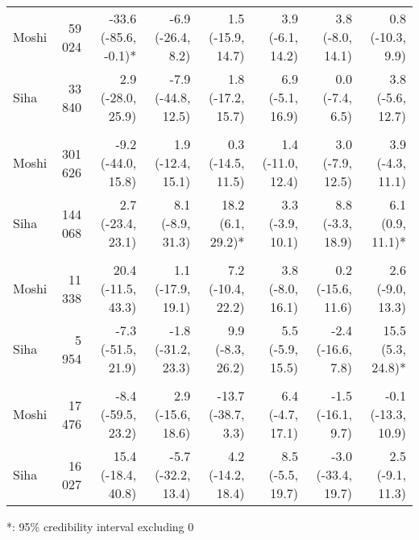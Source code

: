 \begin{table}[t]
\begin{tabular*}{\linewidth}{@{\extracolsep{\fill}}l|rrrrrrr}
\midrule\addlinespace[2.5pt]
Moshi & 59 024 & -33.6 (-85.6, -0.1)* & -6.9 (-26.4, 8.2)  & 1.5 (-15.9, 14.7)  & 3.9 (-6.1, 14.2)  & 3.8 (-8.0, 14.1)  & 0.8 (-10.3, 9.9)  \\ 
Siha & 33 840 & 2.9 (-28.0, 25.9)  & -7.9 (-44.8, 12.5)  & 1.8 (-17.2, 15.7)  & 6.9 (-5.1, 16.9)  & 0.0 (-7.4, 6.5)  & 3.8 (-5.6, 12.7)  \\ 
\midrule\addlinespace[2.5pt]
\multicolumn{8}{l}{Urinary Tract Infections} \\[2.5pt] 
\midrule\addlinespace[2.5pt]
Moshi & 301 626 & -9.2 (-44.0, 15.8)  & 1.9 (-12.4, 15.1)  & 0.3 (-14.5, 11.5)  & 1.4 (-11.0, 12.4)  & 3.0 (-7.9, 12.5)  & 3.9 (-4.3, 11.1)  \\ 
Siha & 144 068 & 2.7 (-23.4, 23.1)  & 8.1 (-8.9, 31.3)  & 18.2 (6.1, 29.2)* & 3.3 (-3.9, 10.1)  & 8.8 (-3.3, 18.9)  & 6.1 (0.9, 11.1)* \\ 
\midrule\addlinespace[2.5pt]
\multicolumn{8}{l}{Malaria} \\[2.5pt] 
\midrule\addlinespace[2.5pt]
Moshi & 11 338 & 20.4 (-11.5, 43.3)  & 1.1 (-17.9, 19.1)  & 7.2 (-10.4, 22.2)  & 3.8 (-8.0, 16.1)  & 0.2 (-15.6, 11.6)  & 2.6 (-9.0, 13.3)  \\ 
Siha & 5 954 & -7.3 (-51.5, 21.9)  & -1.8 (-31.2, 23.3)  & 9.9 (-8.3, 26.2)  & 5.5 (-5.9, 15.5)  & -2.4 (-16.6, 7.8)  & 15.5 (5.3, 24.8)* \\ 
\midrule\addlinespace[2.5pt]
\multicolumn{8}{l}{Infectious Eye Disease} \\[2.5pt] 
\midrule\addlinespace[2.5pt]
Moshi & 17 476 & -8.4 (-59.5, 23.2)  & 2.9 (-15.6, 18.6)  & -13.7 (-38.7, 3.3)  & 6.4 (-4.7, 17.1)  & -1.5 (-16.1, 9.7)  & -0.1 (-13.3, 10.9)  \\ 
Siha & 16 027 & 15.4 (-18.4, 40.8)  & -5.7 (-32.2, 13.4)  & 4.2 (-14.2, 18.4)  & 8.5 (-5.5, 19.7)  & -3.0 (-33.4, 19.7)  & 2.5 (-9.1, 11.3)  \\ 
\bottomrule
\end{tabular*}
\begin{minipage}{\linewidth}
*: 95\% credibility interval excluding 0\\
\end{minipage}
\end{table}

